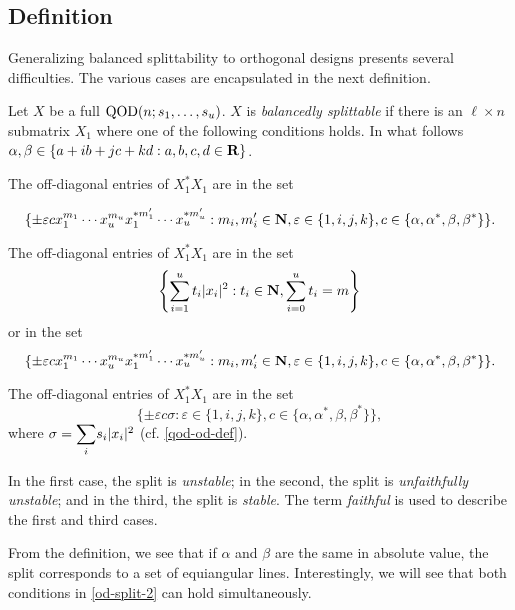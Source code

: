 \documentclass[../../../main]{subfiles}
\begin{document}
\subsection{Definition}

Generalizing balanced splittability to orthogonal designs presents several difficulties. The various cases are encapsulated in the next definition.

\begin{defin}
 Let $X$ be a full $\text{QOD}(n;s_1, \dots, s_u)$. $X$ is {\it balancedly splittable} if there is an $\ell \times n$ submatrix $X_1$ where one of the following conditions holds. In what follows $\alpha, \beta \in \{a+ib+jc+kd : a,b,c,d \in \mathbf{R}\}$.
 \begin{defenum}
  \item The off-diagonal entries of $X_1^*X_1$ are in the set
  \begin{small}
  \[
   \{\pm\varepsilon cx_1^{m_1} \cdots x_u^{m_u}x_1^{*m_1'} \cdots x_u^{*m_u'} : m_i,m_i' \in \mathbf{N}, \varepsilon \in \{1,i,j,k\}, c \in \{\alpha,\alpha^*,\beta,\beta^*\}\}.
  \]
  \end{small}
  
  \item\label{od-split-2} The off-diagonal entries of $X_1^*X_1$ are in the set
  \[
   \left\{
   \sum_{i=1}^u t_i|x_i|^2 : t_i \in \mathbf{N}, \sum_{i=0}^u t_i=m
   \right\}
  \]
  or in the set
  \[
   \{\pm\varepsilon cx_1^{m_1} \cdots x_u^{m_u}x_1^{*m_1'} \cdots x_u^{*m_u'} : m_i,m_i' \in \mathbf{N}, \varepsilon \in \{1,i,j,k\}, c \in \{\alpha,\alpha^*,\beta,\beta^*\}\}.
  \]
  
  \item The off-diagonal entries of $X_1^*X_1$ are in the set 
  \[
   \{\pm\varepsilon c\sigma : \varepsilon \in \{1,i,j,k\}, c \in \{\alpha,\alpha^*,\beta,\beta^*\}\},
  \]
  where $\sigma = \ssum_i s_i|x_i|^2$ (cf. \ref{qod-od-def}).
 \end{defenum}
 In the first case, the split is {\it unstable}; in the second, the split is {\it unfaithfully unstable}; and in the third, the split is {\it stable}. The term {\it faithful} is used to describe the first and third cases.
\end{defin}

From the definition, we see that if $\alpha$ and $\beta$ are the same in absolute value, the split corresponds to a set of equiangular lines. Interestingly, we will see that both conditions in \ref{od-split-2} can hold simultaneously.
\end{document}
